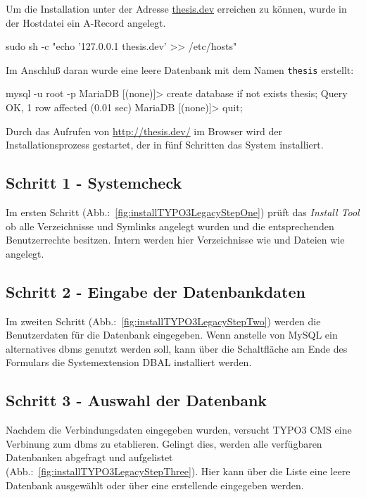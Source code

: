 Um die Installation unter der Adresse \url{thesis.dev} erreichen zu können, wurde in der Hostdatei ein A-Record angelegt.

\begin{shcode}
sudo sh -c "echo '127.0.0.1 thesis.dev' >> /etc/hosts"
\end{shcode}

Im Anschluß daran wurde eine leere Datenbank mit dem Namen \texttt{thesis} erstellt:

\begin{shcode}
mysql -u root -p
MariaDB [(none)]> create database if not exists thesis;
Query OK, 1 row affected (0.01 sec)
MariaDB [(none)]> quit;
\end{shcode}

Durch das Aufrufen von \url{http://thesis.dev/} im Browser wird der Installationsprozess gestartet, der in fünf Schritten das System installiert.

\subsection{Schritt 1 - Systemcheck}
\label{prototype:subsec:OneSystemcheck}
	Im ersten Schritt (Abb.:~\ref{fig:installTYPO3LegacyStepOne}) prüft das \textit{Install Tool} ob alle Verzeichnisse und Symlinks angelegt wurden und die entsprechenden Benutzerrechte besitzen. Intern werden hier Verzeichnisse wie  und Dateien wie  angelegt.

\subsection{Schritt 2 - Eingabe der Datenbankdaten}
\label{prototype:subsec:TwoInsertDatabaseData}
	Im zweiten Schritt (Abb.:~\ref{fig:installTYPO3LegacyStepTwo}) werden die Benutzerdaten für die Datenbank eingegeben. Wenn anstelle von MySQL ein alternatives \gls{dbms} genutzt werden soll, kann über die Schaltfläche am Ende des Formulars die Systemextension DBAL installiert werden.

\subsection{Schritt 3 - Auswahl der Datenbank}
\label{prototype:subsec:ThreeSelectDatabase}
	Nachdem die Verbindungsdaten eingegeben wurden, versucht TYPO3 CMS eine Verbinung zum \gls{dbms} zu etablieren. Gelingt dies, werden alle verfügbaren Datenbanken abgefragt und aufgelistet (Abb.:~\ref{fig:installTYPO3LegacyStepThree}). Hier kann über die Liste eine leere Datenbank ausgewählt oder über eine erstellende eingegeben werden.

